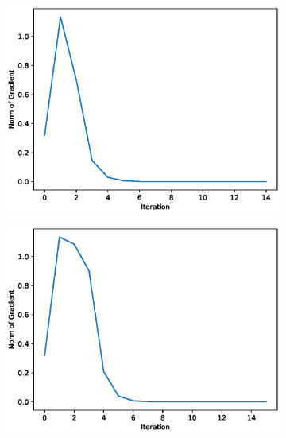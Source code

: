 \begin{figure}[h!]
\centering
\begin{subfigure}[t]{0.4\textwidth}
\centering
    \includegraphics[width=\textwidth]{images/python/sd-pB.eps}
\caption{}
\label{fig:Class distribution}
\end{subfigure}
\hfill 
\begin{subfigure}[t]{0.4\textwidth}
\centering
    \includegraphics[width=\textwidth]{images/python/sec-pB.eps}
    \caption{}
    \label{fig:TSNE}
\end{subfigure}
\hfill
\begin{subfigure}[t]{0.4\textwidth}
\centering

\end{subfigure}
\end{figure}
